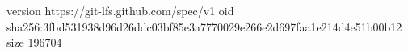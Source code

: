 version https://git-lfs.github.com/spec/v1
oid sha256:3fbd531938d96d26ddc03bf85e3a7770029e266e2d697faa1e214d4e51b00b12
size 196704
